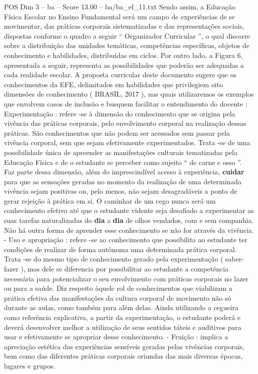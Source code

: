 \begin{textsample}{POS Dim 3 – ba – Score 13.00 – ba/ba\_ef\_11.txt}
Sendo assim, a Educação Física Escolar no Ensino Fundamental será um campo de experiências de se movimentar, das práticas corporais sistematizadas e das representações sociais, dispostas conforme o quadro a seguir “ Organizador Curricular ”, o qual discorre sobre a distribuição das unidades temáticas, competências específicas, objetos de conhecimento e habilidades, distribuídas em ciclos.
Por outro lado, a Figura 6, apresentada a seguir, representa as possibilidades que poderão ser adequadas a cada realidade escolar.
A proposta curricular deste documento sugere que os conhecimentos da EFE, delimitados em habilidades que privilegiem oito dimensões de conhecimento ( BRASIL, 2017 ), nas quais utilizaremos os exemplos que envolvem casos de inclusão e busquem facilitar o entendimento do docente : Experimentação : refere -se à dimensão do conhecimento que se origina pela vivência das práticas corporais, pelo envolvimento corporal na realização dessas práticas.
São conhecimentos que não podem ser acessados sem passar pela vivência corporal, sem que sejam efetivamente experimentados.
Trata -se de uma possibilidade única de apreender as manifestações culturais tematizadas pela Educação Física e de o estudante se perceber como sujeito “ de carne e osso ”.
Faz parte dessa dimensão, além do imprescindível acesso à experiência, \textbf{cuidar} para que as sensações geradas no momento da realização de uma determinada vivência sejam positivas ou, pelo menos, não sejam desagradáveis a ponto de gerar rejeição à prática em si.
O caminhar de um cego nunca será um conhecimento efetivo até que o estudante vidente seja desafiado a experimentar as suas tarefas naturalizadas do \textbf{dia} a \textbf{dia} de olhos vendados, com e sem companhia.
Não há outra forma de aprender esse conhecimento se não for através da vivência. - Uso e apropriação : refere -se ao conhecimento que possibilita ao estudante ter condições de realizar de forma autônoma uma determinada prática corporal.
Trata -se do mesmo tipo de conhecimento gerado pela experimentação ( saber-fazer ), mas dele se diferencia por possibilitar ao estudante a competência necessária para potencializar o seu envolvimento com práticas corporais no lazer ou para a saúde.
Diz respeito àquele rol de conhecimentos que viabilizam a prática efetiva das manifestações da cultura corporal de movimento não só durante as aulas, como também para além delas.
Ainda utilizando a cegueira como referência explicativa, a partir da experimentação, o estudante poderá e deverá desenvolver melhor a utilização de seus sentidos táteis e auditivos para usar e efetivamente se apropriar desse conhecimento. - Fruição : implica a apreciação estética das experiências sensíveis geradas pelas vivências corporais, bem como das diferentes práticas corporais oriundas das mais diversas épocas, lugares e grupos.

\end{textsample}
